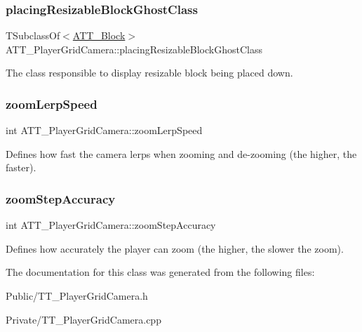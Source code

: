 \subsubsection{\texorpdfstring{placingResizableBlockGhostClass}{placingResizableBlockGhostClass}}
{\footnotesize\ttfamily T\+Subclass\+Of$<$\mbox{\hyperlink{class_a_t_t___block}{A\+T\+T\+\_\+\+Block}}$>$ A\+T\+T\+\_\+\+Player\+Grid\+Camera\+::placing\+Resizable\+Block\+Ghost\+Class\hspace{0.3cm}{\ttfamily [protected]}}



The class responsible to display resizable block being placed down. 

\mbox{\label{class_a_t_t___player_grid_camera_a33d3314f56995c1e6caed175dac6d98c}} 
\subsubsection{\texorpdfstring{zoomLerpSpeed}{zoomLerpSpeed}}
{\footnotesize\ttfamily int A\+T\+T\+\_\+\+Player\+Grid\+Camera\+::zoom\+Lerp\+Speed\hspace{0.3cm}{\ttfamily [protected]}}



Defines how fast the camera lerps when zooming and de-\/zooming (the higher, the faster). 

\mbox{\label{class_a_t_t___player_grid_camera_a840089f30c5196fae78441737475a82f}} 
\subsubsection{\texorpdfstring{zoomStepAccuracy}{zoomStepAccuracy}}
{\footnotesize\ttfamily int A\+T\+T\+\_\+\+Player\+Grid\+Camera\+::zoom\+Step\+Accuracy\hspace{0.3cm}{\ttfamily [protected]}}



Defines how accurately the player can zoom (the higher, the slower the zoom). 



The documentation for this class was generated from the following files\+:\begin{DoxyCompactItemize}
\item 
Public/T\+T\+\_\+\+Player\+Grid\+Camera.\+h\item 
Private/T\+T\+\_\+\+Player\+Grid\+Camera.\+cpp\end{DoxyCompactItemize}
